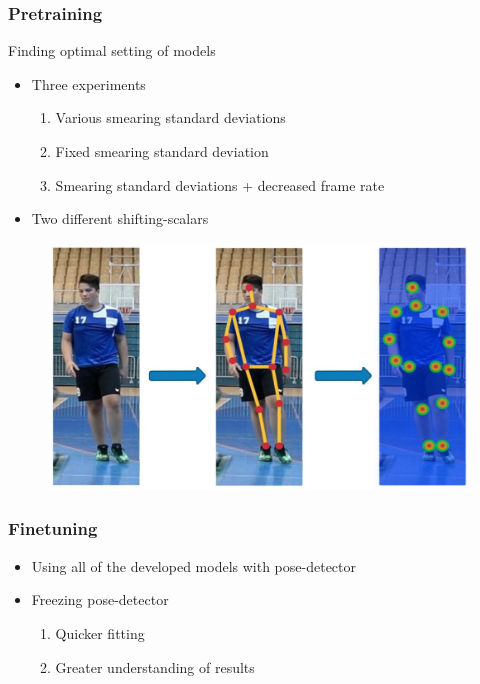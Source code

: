 \documentclass{beamer}
\begin{document}
\begin{frame}
    \frametitle{Pretraining}
    Finding optimal setting of models
    \begin{itemize}
        \item<1-> Three experiments
        \begin{enumerate}
            \item<1-> Various smearing standard deviations
            \item<2-> Fixed smearing standard deviation
            \item<3-> Smearing standard deviations + decreased frame rate
        \end{enumerate}
        \item<4-> Two different shifting-scalars
    \end{itemize}
    \begin{figure}
        \centering
        \includegraphics[width = 0.7 \textwidth]{./entities/heatmaps.png}
    \end{figure}
\end{frame}

\begin{frame}
    \frametitle{Finetuning}
    \begin{itemize}
        \item<1-> Using all of the developed models with pose-detector
        \item<1-> Freezing pose-detector
        \begin{enumerate}
            \item Quicker fitting
            \item Greater understanding of results  
        \end{enumerate}
    \end{itemize}
\end{frame}
\end{document}
